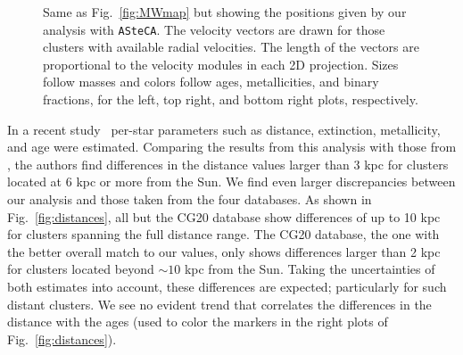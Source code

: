 \documentclass[draft]{aa}
\begin{document}
  \begin{figure}
   \caption{Same as Fig.~\ref{fig:MWmap} but showing the positions given by our
   analysis with \texttt{ASteCA}. The velocity vectors are drawn for those
   clusters with available radial velocities. The length of the vectors are
   proportional to the velocity modules in each 2D projection. Sizes follow
   masses and colors follow ages, metallicities, and binary fractions, for the
   left, top right, and bottom right plots, respectively.}
   \label{fig:MWmap_vectors}
  \end{figure}

  In a recent study~\citep{Anders_2022} per-star parameters such as distance,
  extinction, metallicity, and age were estimated. Comparing the results
  from this analysis with those from \cite{Cantat_2020}, the authors find
  differences in the distance values larger than 3 kpc for clusters located at
  6 kpc or more from the Sun. We find even larger discrepancies between our
  analysis and those taken from the four databases. As shown in
  Fig.~\ref{fig:distances}, all but the CG20 database show differences of up
  to 10 kpc for clusters spanning the full distance range. The CG20
  database, the one with the better overall match to our values, only
  shows differences larger than 2 kpc for clusters located beyond
  $\sim10$ kpc from the Sun. Taking the uncertainties of both estimates
  into account, these differences are expected; particularly for such distant
  clusters.
  We see no evident trend that correlates the differences in the distance with
  the ages (used to color the markers in the right plots of
  Fig.~\ref{fig:distances}).\\
\end{document}
